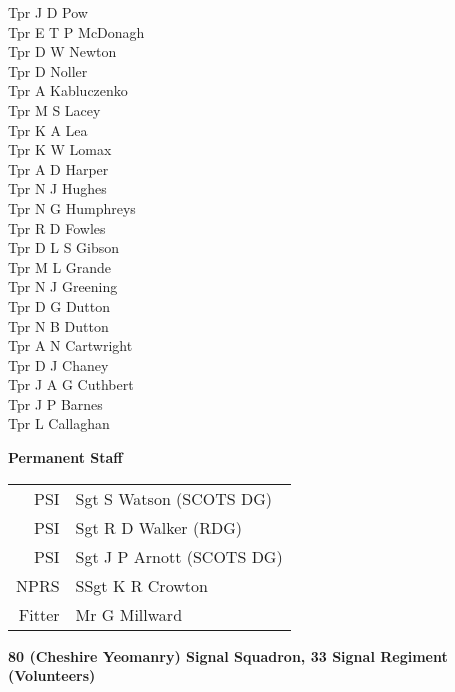 \begin{multicols}{3}
  Tpr J D Pow \\
  Tpr E T P McDonagh \\
  Tpr D W Newton \\
  Tpr D Noller \\
  Tpr A Kabluczenko \\
  Tpr M S Lacey \\
  Tpr K A Lea \\
  Tpr K W Lomax \\
  Tpr A D Harper \\
  Tpr N J Hughes \\
  Tpr N G Humphreys \\
  Tpr R D Fowles \\
  Tpr D L S Gibson \\
  Tpr M L Grande \\
  Tpr N J Greening \\
  Tpr D G Dutton \\
  Tpr N B Dutton \\
  Tpr A N Cartwright \\
  Tpr D J Chaney \\
  Tpr J A G Cuthbert \\
  Tpr J P Barnes \\
  Tpr L Callaghan \\
\end{multicols}

\pagebreak

\vspace*{10mm}

\begin{center}
  \Large
  \textbf{Permanent Staff}
\end{center}

\begin{center}
  \begin{tabular}{rl}
    PSI & Sgt S Watson (SCOTS DG) \\
    PSI & Sgt R D Walker (RDG) \\
    PSI & Sgt J P Arnott (SCOTS DG) \\
    NPRS & SSgt K R Crowton \\
    Fitter & Mr G Millward \\
  \end{tabular}
\end{center}

\vspace{10mm}

\begin{center}
  \Large
  \textbf{80 (Cheshire Yeomanry) Signal Squadron, 33 Signal Regiment (Volunteers)}
\end{center}

